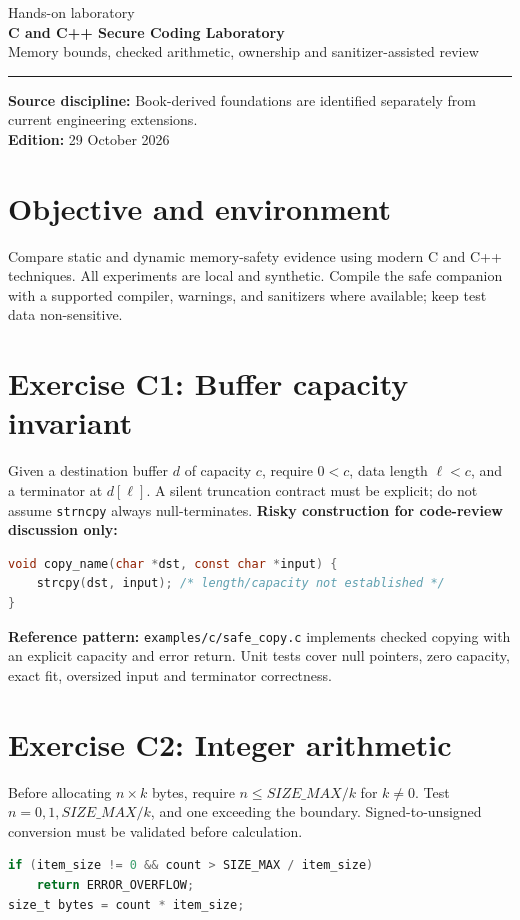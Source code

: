 \documentclass[10pt,letterpaper]{article}
\begin{document}
\hypersetup{pageanchor=false}%
\begin{titlepage}
\vspace*{1.0in}
{\color{bluegray}\Large Hands-on laboratory}\\[1.0em]
{\color{navy}\Huge\bfseries C and C++ Secure Coding Laboratory}\\[0.7em]
{\Large Memory bounds, checked arithmetic, ownership and sanitizer-assisted review}\\[2.0em]
\rule{\linewidth}{1.0pt}
\vfill
\textbf{Source discipline:} Book-derived foundations are identified separately from current engineering extensions.\\
\textbf{Edition:} 29 October 2026
\end{titlepage}\hypersetup{pageanchor=true}
\tableofcontents
\clearpage
\section{Objective and environment}
Compare static and dynamic memory-safety evidence using modern C and C++ techniques. All experiments are local and synthetic. Compile the safe companion with a supported compiler, warnings, and sanitizers where available; keep test data non-sensitive.
\section{Exercise C1: Buffer capacity invariant}
Given a destination buffer \(d\) of capacity \(c\), require \(0<c\), data length \(\ell<c\), and a terminator at \(d[\ell]\). A silent truncation contract must be explicit; do not assume \texttt{strncpy} always null-terminates.
\textbf{Risky construction for code-review discussion only:}
\begin{lstlisting}[language=C]
void copy_name(char *dst, const char *input) {
    strcpy(dst, input); /* length/capacity not established */
}
\end{lstlisting}
\textbf{Reference pattern:} \texttt{examples/c/safe\_copy.c} implements checked copying with an explicit capacity and error return. Unit tests cover null pointers, zero capacity, exact fit, oversized input and terminator correctness.
\section{Exercise C2: Integer arithmetic}
Before allocating \(n\times k\) bytes, require \(n\le SIZE\_MAX/k\) for \(k\ne 0\). Test \(n=0,1,SIZE\_MAX/k\), and one exceeding the boundary. Signed-to-unsigned conversion must be validated before calculation.
\begin{lstlisting}[language=C]
if (item_size != 0 && count > SIZE_MAX / item_size)
    return ERROR_OVERFLOW;
size_t bytes = count * item_size;
\end{lstlisting}
\end{document}
